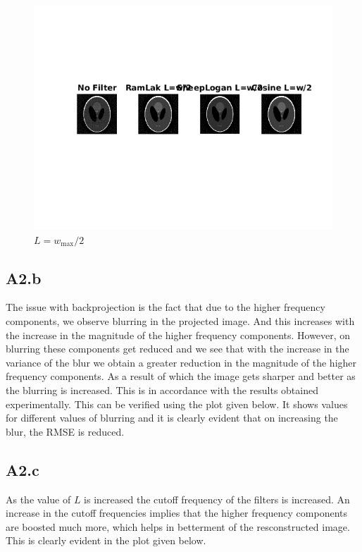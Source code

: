\documentclass{article}
\begin{document}
\begin{figure}[h]
	\centering
	\includegraphics[scale = 0.9]{code/html/mainScript_03.png}
	\caption{$L = w_{\text{max}}/2$}
	\label{Fig :2a2}
\end{figure}

\subsection*{A2.b}

The issue with backprojection is the fact that due to the higher frequency components, we observe blurring in the projected image. And this increases with the increase in the magnitude of the higher frequency components. However, on blurring these components get reduced and we see that with the increase in the variance of the blur we obtain a greater reduction in the magnitude of the higher frequency components. As a result of which the image gets sharper and better as the blurring is increased. This is in accordance with the results obtained experimentally. This can be verified using the plot given below. It shows values for different values of blurring and it is clearly evident that on increasing the blur, the RMSE is reduced.

\subsection*{A2.c}

As the value of $L$ is increased the cutoff frequency of the filters is increased. An increase in the cutoff frequencies implies that the higher frequency components are boosted much more, which helps in betterment of the resconstructed image. This is clearly evident in the plot given below.
\end{document}
